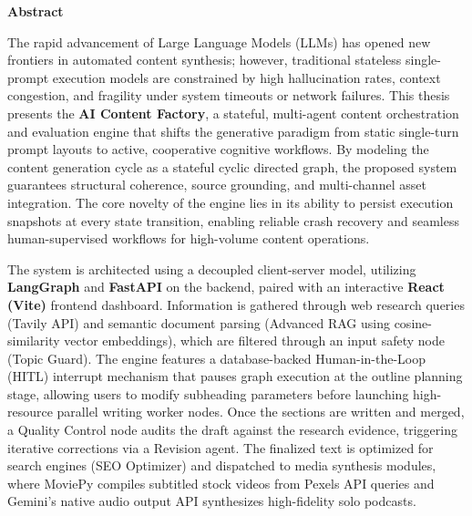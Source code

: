 \begin{center}
\LARGE{\bfseries{Abstract}}
\end{center}

The rapid advancement of Large Language Models (LLMs) has opened new frontiers in automated content synthesis; however, traditional stateless single-prompt execution models are constrained by high hallucination rates, context congestion, and fragility under system timeouts or network failures. This thesis presents the \textbf{AI Content Factory}, a stateful, multi-agent content orchestration and evaluation engine that shifts the generative paradigm from static single-turn prompt layouts to active, cooperative cognitive workflows. By modeling the content generation cycle as a stateful cyclic directed graph, the proposed system guarantees structural coherence, source grounding, and multi-channel asset integration. The core novelty of the engine lies in its ability to persist execution snapshots at every state transition, enabling reliable crash recovery and seamless human-supervised workflows for high-volume content operations.

The system is architected using a decoupled client-server model, utilizing \textbf{LangGraph} and \textbf{FastAPI} on the backend, paired with an interactive \textbf{React (Vite)} frontend dashboard. Information is gathered through web research queries (Tavily API) and semantic document parsing (Advanced RAG using cosine-similarity vector embeddings), which are filtered through an input safety node (Topic Guard). The engine features a database-backed Human-in-the-Loop (HITL) interrupt mechanism that pauses graph execution at the outline planning stage, allowing users to modify subheading parameters before launching high-resource parallel writing worker nodes. Once the sections are written and merged, a Quality Control node audits the draft against the research evidence, triggering iterative corrections via a Revision agent. The finalized text is optimized for search engines (SEO Optimizer) and dispatched to media synthesis modules, where MoviePy compiles subtitled stock videos from Pexels API queries and Gemini's native audio output API synthesizes high-fidelity solo podcasts.

